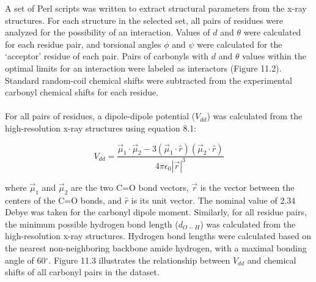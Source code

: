 \begin{doublespace}
A set of Perl scripts was written to extract structural parameters from
the x-ray structures. For each structure in the selected set, all pairs of
residues were analyzed for the possibility of an \npistar{} interaction. Values
of $d$ and $\theta$ were calculated for each residue pair, and torsional angles
$\phi$ and $\psi$ were calculated for the `acceptor' residue of each pair.
Pairs of carbonyls with $d$ and $\theta$ values within the optimal limits for
an \npistar{} interaction were labeled as interactors (Figure 11.2). Standard
random-coil chemical shifts were subtracted from the experimental carbonyl
\cnmr{} chemical shifts for each residue.
\\\\
For all pairs of residues, a dipole-dipole potential ($V_{dd}$) was calculated
from the high-resolution x-ray structures using equation 8.1:

\begin{equation}
V_{dd} = \frac{
  \vec{\mu}_1 \cdot \vec{\mu}_2 - 3 
    (\vec{\mu}_1 \cdot \hat{r})
    (\vec{\mu}_2 \cdot \hat{r})}{
  4 \pi \epsilon_0 |\vec{r}|^3}
\end{equation}

where $\vec{\mu}_1$ and $\vec{\mu}_2$ are the two C=O bond vectors, $\vec{r}$
is the vector between the centers of the C=O bonds, and $\hat{r}$ is its unit
vector. The nominal value of 2.34 Debye was taken for the carbonyl dipole
moment. Similarly, for all residue pairs, the minimum possible hydrogen bond
length ($d_{O-H}$) was calculated from the high-resolution x-ray structures.
Hydrogen bond lengths were calculated based on the nearest non-neighboring
backbone amide hydrogen, with a maximal bonding angle of 60$^\circ$.
Figure 11.3 illustrates the relationship between $V_{dd}$ and \cnmr{}
chemical shifts of all carbonyl pairs in the dataset.
\end{doublespace}

